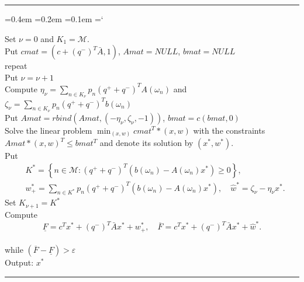 \documentclass{report}
\theoremstyle{plain}
\theoremstyle{remark}
\newenvironment{algorithmJP} 
{\def\block{\phantom{a}\hspace{10pt}}\setlength{\parindent}{0pt} \par \vspace{\baselineskip}\hrule%
\smallskip \ttfamily %
\fontdimen2\font=0.4em%
\fontdimen3\font=0.2em%
\fontdimen7\font=0.1em%
\hyphenchar\font=`\-%
}
{\smallskip \hrule \vspace{\baselineskip}\par}
\begin{document}
\nopagecolor
 \rmfamily\normalsize
 \begin{algorithmJP} 
 Set  $\nu =0$ and $K_1 = \mathcal{M}$. \\
 Put $cmat = (c+ (q^-)^T{\bar A}, 1)$, $Amat = NULL$, $bmat = NULL$ \\
 
 repeat \\
  \block Put $\nu = \nu+1$\\
  \block Compute $\eta_\nu = \sum_{n\in K_\nu}    p_n (q^+ + q^-)^T A(\omega_n)$ and $\zeta_\nu = \sum_{n\in K_\nu}  p_n (q^+ + q^-)^Tb(\omega_n)$\\
  \block Put $Amat = rbind(Amat, (-\eta_\nu, \zeta_\nu, -1))$, $bmat = c(bmat,0)$\\
  \block Solve the linear problem $\min_{(x,w)} cmat^T*(x,w)$ with the constraints\\
  \block  $Amat * (x,w)^T \le bmat^T$   and denote its solution by $(x^*, w^*)$. \\
  \block Put 
 \begin{align*}
  &K^* = \left\{n\in \mathcal{M}\colon \left(q^+ + q^-\right)^T\left(b\left(\omega_n\right) - A\left(\omega_n\right)x^*\right) \ge 0\right\}, \\
  &w_+^* = \sum_{n\in K^*} p_n \left(q^+ + q^-\right)^T\left(b\left(\omega_n\right) - A\left(\omega_n\right)x^*\right), \quad \hat w^* =  \zeta_\nu - \eta_\nu x^*.
  \end{align*}
 \block Set $K_{\nu +1} = K^*$\\
 \block  Compute
 \[
  \underline{F} = c^Tx^* + \left(q^-\right)^T{\bar A} x^* +  w_+^*, \quad \overline{F} = c^Tx^* +  \left(q^-\right)^T{\bar A} x^* +  \hat w^*. 
 \]
 \block \\
 while $(\overline{F} - \underline{F}) > \varepsilon$\\[2pt]
 
 Output: $x^*$
 \end{algorithmJP}
\end{document}

